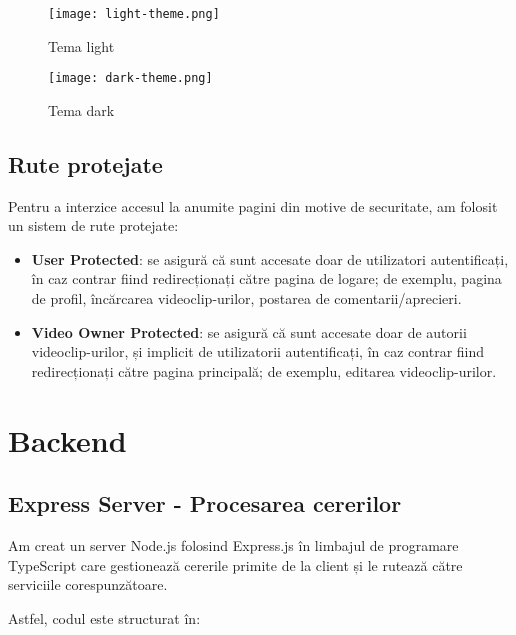 \begin{figure}[h]
    \centering
    \begin{minipage}{0.49\textwidth}
        \centering
        \texttt{[image: light-theme.png]}
        \caption{Tema light}
        \label{fig:light-theme}
    \end{minipage}\hfill
    \begin{minipage}{0.49\textwidth}
        \centering
        \texttt{[image: dark-theme.png]}
        \caption{Tema dark}
        \label{fig:dark-theme}
    \end{minipage}
\end{figure}

\subsection{Rute protejate}
Pentru a interzice accesul la anumite pagini din motive de securitate, am folosit un sistem
de rute protejate:
\begin{itemize}
    \item \textbf{User Protected}: se asigură că sunt accesate doar de utilizatori autentificați,
    în caz contrar fiind redirecționați către pagina de logare; de exemplu, pagina de profil,
    încărcarea videoclip-urilor, postarea de comentarii/aprecieri.
    \item \textbf{Video Owner Protected}: se asigură că sunt accesate doar de autorii videoclip-urilor,
    și implicit de utilizatorii autentificați, în caz contrar fiind redirecționați către pagina principală;
    de exemplu, editarea videoclip-urilor.
\end{itemize}

\section{Backend}

\subsection{Express Server - Procesarea cererilor}
Am creat un server Node.js folosind Express.js în limbajul de programare TypeScript care
gestionează cererile primite de la client și le rutează către serviciile corespunzătoare.
\par
Astfel, codul este structurat în:

